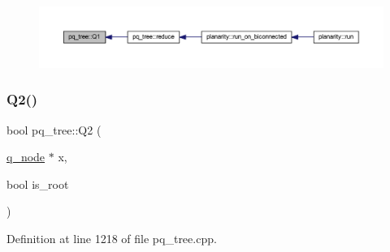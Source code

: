 \begin{figure}[H]
\begin{center}
\leavevmode
\includegraphics[width=350pt]{classpq__tree_ab1c7266de209f9ac9f3267b4d8cafc48_icgraph}
\end{center}
\end{figure}
\mbox{\label{classpq__tree_a76ca10878264d589c1a11f4f4bf93f83}} 
\subsubsection{\texorpdfstring{Q2()}{Q2()}}
{\footnotesize\ttfamily bool pq\+\_\+tree\+::\+Q2 (\begin{DoxyParamCaption}\item[{\mbox{\hyperlink{classq__node}{q\+\_\+node}} $\ast$}]{x,  }\item[{bool}]{is\+\_\+root }\end{DoxyParamCaption})\hspace{0.3cm}{\ttfamily [private]}}



Definition at line 1218 of file pq\+\_\+tree.\+cpp.


